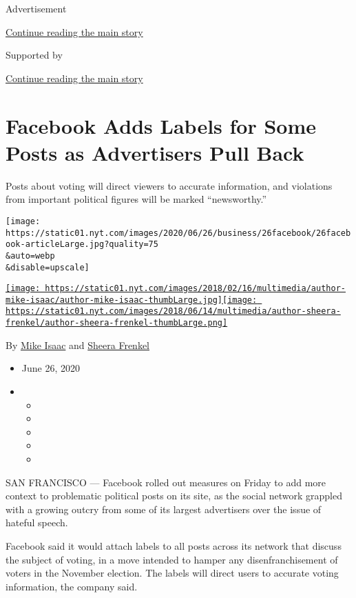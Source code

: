Advertisement

\protect\hyperlink{after-top}{Continue reading the main story}

Supported by

\protect\hyperlink{after-sponsor}{Continue reading the main story}

\hypertarget{facebook-adds-labels-for-some-posts-as-advertisers-pull-back}{%
\section{Facebook Adds Labels for Some Posts as Advertisers Pull
Back}\label{facebook-adds-labels-for-some-posts-as-advertisers-pull-back}}

Posts about voting will direct viewers to accurate information, and
violations from important political figures will be marked
``newsworthy.''

\texttt{[image: https://static01.nyt.com/images/2020/06/26/business/26facebook/26facebook-articleLarge.jpg?quality=75\\\&auto=webp\\\&disable=upscale]}

\href{https://www.nytimes.com/by/mike-isaac}{\texttt{[image: https://static01.nyt.com/images/2018/02/16/multimedia/author-mike-isaac/author-mike-isaac-thumbLarge.jpg]}}\href{https://www.nytimes.com/by/sheera-frenkel}{\texttt{[image: https://static01.nyt.com/images/2018/06/14/multimedia/author-sheera-frenkel/author-sheera-frenkel-thumbLarge.png]}}

By \href{https://www.nytimes.com/by/mike-isaac}{Mike Isaac} and
\href{https://www.nytimes.com/by/sheera-frenkel}{Sheera Frenkel}

\begin{itemize}
\item
  June 26, 2020
\item
  \begin{itemize}
  \item
  \item
  \item
  \item
  \item
  \end{itemize}
\end{itemize}

SAN FRANCISCO --- Facebook rolled out measures on Friday to add more
context to problematic political posts on its site, as the social
network grappled with a growing outcry from some of its largest
advertisers over the issue of hateful speech.

Facebook said it would attach labels to all posts across its network
that discuss the subject of voting, in a move intended to hamper any
disenfranchisement of voters in the November election. The labels will
direct users to accurate voting information, the company said.

